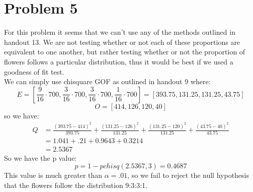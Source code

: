 \documentclass{article}
\begin{document}
\section*{Problem 5}
For this problem it seems that we can't use any of the methods outlined in handout 13. We are not testing whether or not each of these proportions are equivalent to one another, but rather testing whether or not the proportion of flowers follows a particular distribution, thus it would be best if we used a goodness of fit test. \\
We can simply use chisquare GOF as outlined in handout 9 where: \\
\[
E = [\frac{9}{16} \cdot 700, \frac{3}{16} \cdot 700, \frac{3}{16} \cdot 700, \frac{1}{16} \cdot 700] = [393.75, 131.25, 131.25, 43.75]
\]
\[
O = [414, 126, 120, 40]
\]
so we have: \\
\begin{align*}
Q &= \frac{(393.75 - 414)^2}{393.75} + \frac{(131.25- 126)^2}{131.25} + \frac{(131.25- 120)^2}{131.25} + \frac{(43.75- 40)^2}{43.75} \\
&= 1.041 + .21 + 0.9643 + 0.3214 \\
&= 2.5367
\end{align*}
So we have the p value: \\
\[
p = 1 - pchisq(2.5367, 3) = 0.4687
\]
This value is much greater than $\alpha = .01$, so we fail to reject the null hypothesis that the flowers follow the distribution 9:3:3:1. 
\end{document}
